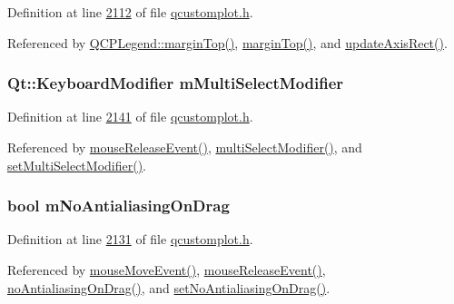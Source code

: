 Definition at line \hyperlink{a00116_source_l02112}{2112} of file \hyperlink{a00116_source}{qcustomplot.\+h}.



Referenced by \hyperlink{a00116_source_l01469}{Q\+C\+P\+Legend\+::margin\+Top()}, \hyperlink{a00116_source_l01960}{margin\+Top()}, and \hyperlink{a00115_source_l08116}{update\+Axis\+Rect()}.

\hypertarget{a00116_a690dbabf892af5969b09e9f69bb83a9b}{
\subsubsection[{m\+Multi\+Select\+Modifier}]{\setlength{\rightskip}{0pt plus 5cm}Qt\+::\+Keyboard\+Modifier m\+Multi\+Select\+Modifier}}\label{a00116_a690dbabf892af5969b09e9f69bb83a9b}


Definition at line \hyperlink{a00116_source_l02141}{2141} of file \hyperlink{a00116_source}{qcustomplot.\+h}.



Referenced by \hyperlink{a00115_source_l07691}{mouse\+Release\+Event()}, \hyperlink{a00116_source_l01982}{multi\+Select\+Modifier()}, and \hyperlink{a00115_source_l06436}{set\+Multi\+Select\+Modifier()}.

\hypertarget{a00116_abfc5e49800e5ca84fa6312b9bb814b3b}{
\subsubsection[{m\+No\+Antialiasing\+On\+Drag}]{\setlength{\rightskip}{0pt plus 5cm}bool m\+No\+Antialiasing\+On\+Drag}}\label{a00116_abfc5e49800e5ca84fa6312b9bb814b3b}


Definition at line \hyperlink{a00116_source_l02131}{2131} of file \hyperlink{a00116_source}{qcustomplot.\+h}.



Referenced by \hyperlink{a00115_source_l07639}{mouse\+Move\+Event()}, \hyperlink{a00115_source_l07691}{mouse\+Release\+Event()}, \hyperlink{a00116_source_l01980}{no\+Antialiasing\+On\+Drag()}, and \hyperlink{a00115_source_l06396}{set\+No\+Antialiasing\+On\+Drag()}.

